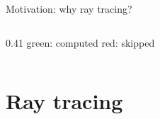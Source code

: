 \documentclass[8pt, xcolor=table,aspectratio=169]{beamer}
\begin{document}
\begin{frame}{\textcolor{activecolor}{Motivation: why ray tracing?}}
\begin{columns}[T]
\begin{column}{0.41\textwidth}
{        \smallskip
        {
        \footnotesize \textcolor{green!40!black}{green}: computed \quad
        \textcolor{red!70!black}{red}: skipped}
      }
    \end{column}
  \end{columns}
\end{frame}

\section{Ray tracing}
% 
%        
% 
%  
\end{document}
